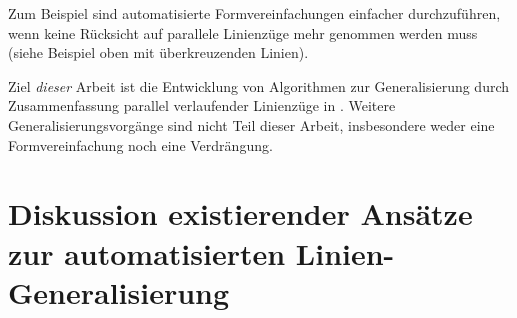\documentclass[../main/thesis.tex]{subfiles}
\begin{document}
Zum Beispiel sind automatisierte Formvereinfachungen einfacher durchzuführen, wenn keine Rücksicht auf parallele Linienzüge mehr genommen werden muss (siehe Beispiel oben mit überkreuzenden Linien).

Ziel \emph{dieser} Arbeit ist die Entwicklung von Algorithmen zur Generalisierung durch Zusammenfassung parallel verlaufender Linienzüge in \osm{}. Weitere Generalisierungsvorgänge sind nicht Teil dieser Arbeit, insbesondere weder eine Formvereinfachung noch eine Verdrängung.

%	
%	
%	



\section[Diskussion existierender Ansätze]{Diskussion existierender Ansätze zur automatisierten Linien-Generalisierung}
\end{document}
